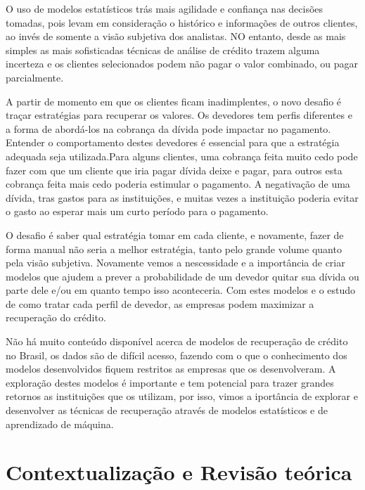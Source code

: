 \documentclass[12pt,a4paper]{article}
\begin{document}
    O uso de modelos estatísticos trás mais agilidade e confiança nas decisões tomadas, pois levam em consideração o histórico e informações de outros clientes, ao invés de somente a visão subjetiva dos analistas. NO entanto, desde as mais simples as mais sofisticadas técnicas de análise de crédito trazem alguma incerteza e os clientes selecionados podem não pagar o valor combinado, ou pagar parcialmente.
    
    A partir de momento em que os clientes ficam inadimplentes, o novo desafio é traçar estratégias para recuperar os valores. Os devedores tem perfis diferentes e a forma de abordá-los na cobrança da dívida pode impactar no pagamento. Entender o comportamento destes devedores é essencial para que a estratégia adequada seja utilizada.Para alguns clientes, uma cobrança feita muito cedo pode fazer com que um cliente que iria pagar dívida deixe e pagar, para outros esta cobrança feita mais cedo poderia estimular o pagamento. A negativação de uma dívida, tras gastos para as instituições, e muitas vezes a instituição poderia evitar o gasto ao esperar mais um curto período para o pagamento.
    
    O desafio é saber qual estratégia tomar em cada cliente, e novamente, fazer de forma manual não seria a melhor estratégia, tanto pelo grande volume quanto pela visão subjetiva. Novamente vemos a nescessidade e a importância de criar modelos que ajudem a prever a probabilidade de um devedor quitar sua dívida ou parte dele e/ou em quanto tempo isso aconteceria. Com estes modelos e o estudo de como tratar cada perfil de devedor, as empresas podem maximizar a recuperação do crédito.
    
    Não há muito conteúdo disponível acerca de modelos de recuperação de crédito no Brasil, os dados são de difícil acesso, fazendo com o que o conhecimento dos modelos desenvolvidos fiquem restritos as empresas que os desenvolveram. A exploração destes modelos é importante e tem potencial para trazer grandes retornos as instituições que os utilizam, por isso, vimos a iportância de explorar e desenvolver as técnicas de recuperação através de modelos estatísticos e de aprendizado de máquina.

\section{Contextualização e Revisão teórica}
 
\end{document}
